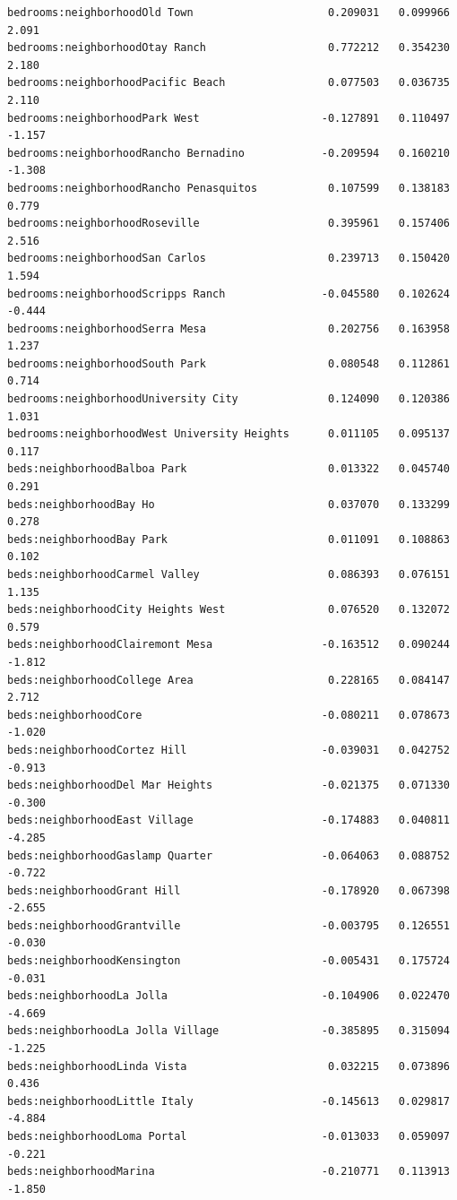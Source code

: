 \documentclass[
  letterpaper,
  DIV=11,
  numbers=noendperiod,
  oneside]{scrreprt}
\begin{document}
\begin{verbatim}
bedrooms:neighborhoodOld Town                     0.209031   0.099966   2.091
bedrooms:neighborhoodOtay Ranch                   0.772212   0.354230   2.180
bedrooms:neighborhoodPacific Beach                0.077503   0.036735   2.110
bedrooms:neighborhoodPark West                   -0.127891   0.110497  -1.157
bedrooms:neighborhoodRancho Bernadino            -0.209594   0.160210  -1.308
bedrooms:neighborhoodRancho Penasquitos           0.107599   0.138183   0.779
bedrooms:neighborhoodRoseville                    0.395961   0.157406   2.516
bedrooms:neighborhoodSan Carlos                   0.239713   0.150420   1.594
bedrooms:neighborhoodScripps Ranch               -0.045580   0.102624  -0.444
bedrooms:neighborhoodSerra Mesa                   0.202756   0.163958   1.237
bedrooms:neighborhoodSouth Park                   0.080548   0.112861   0.714
bedrooms:neighborhoodUniversity City              0.124090   0.120386   1.031
bedrooms:neighborhoodWest University Heights      0.011105   0.095137   0.117
beds:neighborhoodBalboa Park                      0.013322   0.045740   0.291
beds:neighborhoodBay Ho                           0.037070   0.133299   0.278
beds:neighborhoodBay Park                         0.011091   0.108863   0.102
beds:neighborhoodCarmel Valley                    0.086393   0.076151   1.135
beds:neighborhoodCity Heights West                0.076520   0.132072   0.579
beds:neighborhoodClairemont Mesa                 -0.163512   0.090244  -1.812
beds:neighborhoodCollege Area                     0.228165   0.084147   2.712
beds:neighborhoodCore                            -0.080211   0.078673  -1.020
beds:neighborhoodCortez Hill                     -0.039031   0.042752  -0.913
beds:neighborhoodDel Mar Heights                 -0.021375   0.071330  -0.300
beds:neighborhoodEast Village                    -0.174883   0.040811  -4.285
beds:neighborhoodGaslamp Quarter                 -0.064063   0.088752  -0.722
beds:neighborhoodGrant Hill                      -0.178920   0.067398  -2.655
beds:neighborhoodGrantville                      -0.003795   0.126551  -0.030
beds:neighborhoodKensington                      -0.005431   0.175724  -0.031
beds:neighborhoodLa Jolla                        -0.104906   0.022470  -4.669
beds:neighborhoodLa Jolla Village                -0.385895   0.315094  -1.225
beds:neighborhoodLinda Vista                      0.032215   0.073896   0.436
beds:neighborhoodLittle Italy                    -0.145613   0.029817  -4.884
beds:neighborhoodLoma Portal                     -0.013033   0.059097  -0.221
beds:neighborhoodMarina                          -0.210771   0.113913  -1.850

\end{verbatim}
\end{document}
